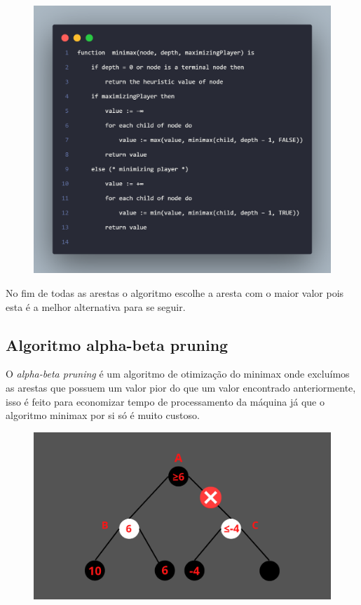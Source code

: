 \begin{figure}[!htb]
    \centering
    \label{minimax-code}
    \includegraphics[scale=0.15]{figuras/minimax.png}
\end{figure}

No fim de todas as arestas o algoritmo escolhe a aresta com o maior valor pois esta é a melhor alternativa para se seguir.

\subsection{Algoritmo alpha-beta pruning}

O \textit{alpha-beta pruning} é um algoritmo de otimização do minimax onde excluímos as arestas que possuem um valor
pior do que um valor encontrado anteriormente, isso é feito para economizar tempo de processamento da máquina
já que o algoritmo minimax por si só é muito custoso.
\begin{figure}[!htb]
    \centering
    \label{alpha-beta}
    \includegraphics[scale=0.15]{figuras/Inserir_um_pouquinho_de_texto_1.png}
\end{figure}


